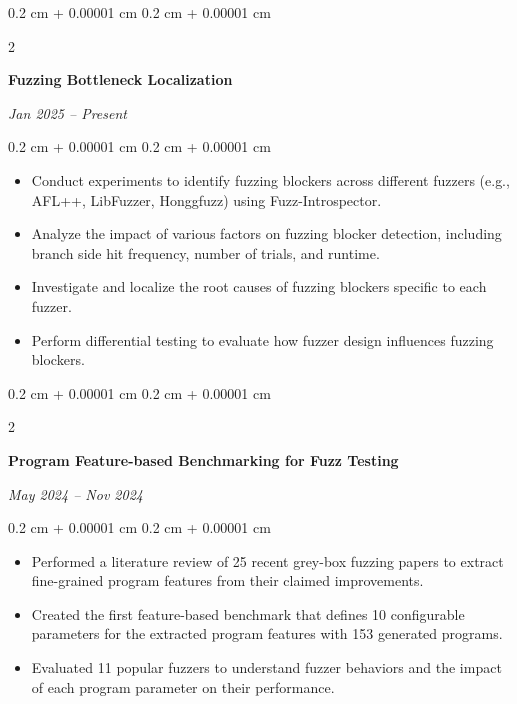 \documentclass[10pt, letterpaper]{article}
\newenvironment{highlights}{
    \begin{itemize}[
        topsep=0.10 cm,
        parsep=0.10 cm,
        partopsep=0pt,
        itemsep=0pt,
        leftmargin=0.4 cm + 10pt
    ]
}{
    \end{itemize}
} %
\newenvironment{onecolentry}{
    \begin{adjustwidth}{
        0.2 cm + 0.00001 cm
    }{
        0.2 cm + 0.00001 cm
    }
}{
    \end{adjustwidth}
} %
\newenvironment{twocolentry}[2][]{
    \onecolentry
    \def\secondColumn{#2}
    \setcolumnwidth{\fill, 4.5 cm}
    \begin{paracol}{2}
}{
    \switchcolumn \raggedleft \secondColumn
    \end{paracol}
    \endonecolentry
} %
\begin{document}
        \begin{twocolentry}{
        \textit{Jan 2025 – Present}}
            \textbf{Fuzzing Bottleneck Localization}
        \end{twocolentry}

        \vspace{0.10 cm}
        \begin{onecolentry}
            \begin{highlights}
                \item Conduct experiments to identify fuzzing blockers across different fuzzers (e.g., AFL++, LibFuzzer, Honggfuzz) using Fuzz-Introspector.  
                \item Analyze the impact of various factors on fuzzing blocker detection, including branch side hit frequency, number of trials, and runtime.  
                \item Investigate and localize the root causes of fuzzing blockers specific to each fuzzer.  
                \item Perform differential testing to evaluate how fuzzer design influences fuzzing blockers.  
            \end{highlights}
        \end{onecolentry}

        \vspace{0.2 cm}


        \begin{twocolentry}{
        \textit{May 2024 – Nov 2024}}
            \textbf{Program Feature-based Benchmarking for Fuzz Testing}
        \end{twocolentry}

        \vspace{0.10 cm}
        \begin{onecolentry}
            \begin{highlights}
                \item Performed a literature review of 25 recent grey-box fuzzing papers to extract fine-grained program features from their claimed improvements. 
                \item Created the first feature-based benchmark that defines 10 configurable parameters for the extracted program features with 153 generated programs. 
                \item Evaluated 11 popular fuzzers to understand fuzzer behaviors and the impact of each program parameter on their performance. 

            \end{highlights}
        \end{onecolentry}
\end{document}

